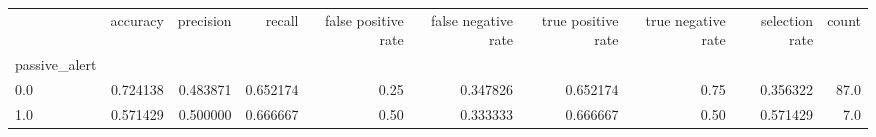 \begin{tabular}{lrrrrrrrrr}
\toprule
{} &  accuracy &  precision &    recall &  false positive rate &  false negative rate &  true positive rate &  true negative rate &  selection rate &  count \\
passive\_alert &           &            &           &                      &                      &                     &                     &                 &        \\
\midrule
0.0           &  0.724138 &   0.483871 &  0.652174 &                 0.25 &             0.347826 &            0.652174 &                0.75 &        0.356322 &   87.0 \\
1.0           &  0.571429 &   0.500000 &  0.666667 &                 0.50 &             0.333333 &            0.666667 &                0.50 &        0.571429 &    7.0 \\
\bottomrule
\end{tabular}
